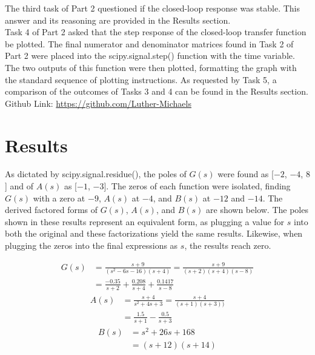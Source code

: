 \documentclass[12pt]{report}
\begin{document}
The third task of Part 2 questioned if the closed-loop response was stable. This answer and its reasoning are provided in the Results section. \\

Task 4 of Part 2 asked that the step response of the closed-loop transfer function be plotted. The final numerator and denominator matrices found in Task 2 of Part 2 were placed into the scipy.signal.step() function with the time variable. The two outputs of this function were then plotted, formatting the graph with the standard sequence of plotting instructions. As requested by Task 5, a comparison of the outcomes of Tasks 3 and 4 can be found in the Results section.\\

Github Link: \url{https://github.com/Luther-Michaels} \\
	
\section{Results}

As dictated by scipy.signal.residue(), the poles of $ G(s) $ were found as [$ -2 $, $ -4 $, $ 8 $] and of $ A(s) $ as [$ -1 $, $ -3 $]. The zeros of each function were isolated, finding $ G(s) $ with a zero at $ -9 $, $ A(s) $ at $ -4 $, and $ B(s) $ at $ -12 $ and $ -14 $. The derived factored forms of $ G(s) $, $ A(s) $, and $ B(s) $ are shown below. The poles shown in these results represent an equivalent form, as plugging a value for $ s $ into both the original and these factorizations yield the same results. Likewise, when plugging the zeros into the final expressions as $ s $, the results reach zero.

\begin{align*}
	G(s) &= \frac{s + 9}{(s^2 - 6s - 16)(s + 4)} = \frac{s + 9}{(s + 2)(s + 4)(s - 8)} \\
	&= \frac{-0.35}{s + 2} + \frac{0.208}{s + 4} + \frac{0.1417}{s - 8}
\end{align*}
\begin{align*}
	A(s) &= \frac{s + 4}{s^2 + 4s + 3} = \frac{s + 4}{(s + 1)(s + 3))} \\
	&= \frac{1.5}{s + 1} - \frac{0.5}{s + 3}
\end{align*}
\begin{align*}
	B(s) &= s^2 + 26s + 168 \\
	&= (s + 12)(s + 14)
\end{align*}
\end{document}
